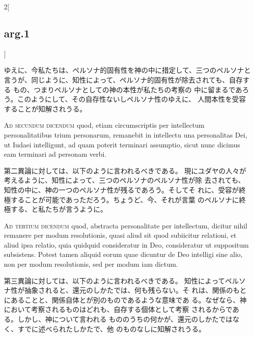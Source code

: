 \documentclass[paper=a4paper,fontsize=10pt,jafontsize=9pt,titlepage]{jlreq}
\begin{document}
\begin{paracol}{2}[\subsection{arg.1}]
\switchcolumn

ゆえに、今私たちは、ペルソナ的固有性を神の中に措定して、三つのペルソナと
 言うが、同じように、知性によって、ペルソナ的固有性が除去されても、自存する
 もの、つまりペルソナとしての神の本性が私たちの考察の
 中に留まるであろう。このようにして、その自存性ないしペルソナ性のゆえに、
 人間本性を受容することが知解されうる。

\switchcolumn*[\subsection{ad.2}]

{\scshape Ad secundum dicendum} quod, etiam circumscriptis per intellectum
personalitatibus trium personarum, remanebit in intellectu una
personalitas Dei, ut Iudaei intelligunt, ad quam poterit terminari
assumptio, sicut nunc dicimus eam terminari ad personam verbi.

\switchcolumn

第二異論に対しては、以下のように言われるべきである。
現にユダヤの人々が考えるように、知性によって、三つのペルソナのペルソナ性が除
 去されても、知性の中に、神の一つのペルソナ性が残るであろう。そしてそ
 れに、受容が終極することが可能であっただろう。ちょうど、今、それが言葉
 のペルソナに終極する、と私たちが言うように。

\switchcolumn*[\subsection{ad.3}]

{\scshape Ad tertium dicendum} quod, abstracta personalitate per intellectum,
dicitur nihil remanere per modum resolutionis, quasi aliud sit quod
subiicitur relationi, et aliud ipsa relatio, quia quidquid consideratur
in Deo, consideratur ut suppositum subsistens. Potest tamen aliquid
eorum quae dicuntur de Deo intelligi sine alio, non per modum
resolutionis, sed per modum iam dictum.

\switchcolumn

第三異論に対しては、以下のように言われるべきである。
知性によってペルソナ性が抽象されると、還元のしかたでは、何も残らない。そ
 れは、関係のもとにあることと、関係自体とが別のものであるような意味であ
 る。なぜなら、神において考察されるものはどれも、自存する個体として考察
 されるからである。しかし、神について言われる
 もののうちの何かが、還元のしかたではなく、すでに述べられたしかたで、他
 のものなしに知解されうる。

\end{paracol}
\newpage
{}
{}
\setcounter{section}{4}
\setcounter{subsection}{0}
\end{document}
